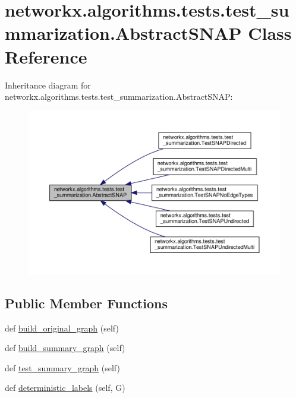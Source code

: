 \hypertarget{classnetworkx_1_1algorithms_1_1tests_1_1test__summarization_1_1AbstractSNAP}{}\section{networkx.\+algorithms.\+tests.\+test\+\_\+summarization.\+Abstract\+S\+N\+AP Class Reference}
\label{classnetworkx_1_1algorithms_1_1tests_1_1test__summarization_1_1AbstractSNAP}


Inheritance diagram for networkx.\+algorithms.\+tests.\+test\+\_\+summarization.\+Abstract\+S\+N\+AP\+:
\nopagebreak
\begin{figure}[H]
\begin{center}
\leavevmode
\includegraphics[width=350pt]{classnetworkx_1_1algorithms_1_1tests_1_1test__summarization_1_1AbstractSNAP__inherit__graph}
\end{center}
\end{figure}
\subsection*{Public Member Functions}
\begin{DoxyCompactItemize}
\item 
def \hyperlink{classnetworkx_1_1algorithms_1_1tests_1_1test__summarization_1_1AbstractSNAP_ab14c782cc5c7d2bc3da5b00f801d776f}{build\+\_\+original\+\_\+graph} (self)
\item 
def \hyperlink{classnetworkx_1_1algorithms_1_1tests_1_1test__summarization_1_1AbstractSNAP_af2bcbeb78a85256cb7d8d5ac711fd35f}{build\+\_\+summary\+\_\+graph} (self)
\item 
def \hyperlink{classnetworkx_1_1algorithms_1_1tests_1_1test__summarization_1_1AbstractSNAP_a7ad73eb2135a125f4653d1c635d40860}{test\+\_\+summary\+\_\+graph} (self)
\item 
def \hyperlink{classnetworkx_1_1algorithms_1_1tests_1_1test__summarization_1_1AbstractSNAP_abdfb05f1eafa76155a40d2ad220b07fb}{deterministic\+\_\+labels} (self, G)
\end{DoxyCompactItemize}
